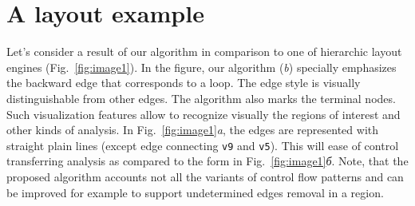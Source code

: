\documentclass[conference]{IEEEtran}
\begin{document}


\section{A layout example}

Let's consider a result of our algorithm in comparison to one of hierarchic layout engines (Fig.~\ref{fig:image1}).  In the figure, our algorithm (\emph{b}) specially emphasizes the backward edge that corresponds to a loop.  The edge style is visually distinguishable from other edges.  The algorithm also marks the terminal nodes.  Such visualization features allow to recognize visually the regions of interest and other kinds of analysis.  In Fig.~\ref{fig:image1}\emph{a}, the edges are represented with straight plain lines (except edge connecting \texttt{v9} and \texttt{v5}).  This will ease of control transferring analysis as compared to the form in Fig.~\ref{fig:image1}\emph{б}. Note, that the proposed algorithm accounts not all the variants of control flow patterns and can be improved for example to support undetermined edges removal in a region.
\end{document}
